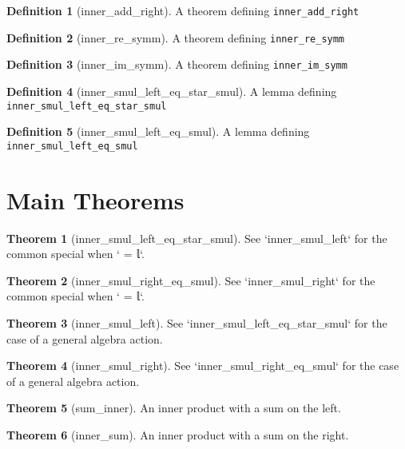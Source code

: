 \documentclass{article}
\theoremstyle{definition}
\newtheorem{definition}{Definition}
\newtheorem{theorem}{Theorem}
\begin{document}
\begin{definition}[inner_add_right]
A theorem defining \texttt{inner_add_right}
\end{definition}

\begin{definition}[inner_re_symm]
A theorem defining \texttt{inner_re_symm}
\end{definition}

\begin{definition}[inner_im_symm]
A theorem defining \texttt{inner_im_symm}
\end{definition}

\begin{definition}[inner_smul_left_eq_star_smul]
A lemma defining \texttt{inner_smul_left_eq_star_smul}
\end{definition}

\begin{definition}[inner_smul_left_eq_smul]
A lemma defining \texttt{inner_smul_left_eq_smul}
\end{definition}

\section{Main Theorems}
\begin{theorem}[inner_smul_left_eq_star_smul]
See `inner_smul_left` for the common special when ` = 𝕝`.
\end{theorem}

\begin{theorem}[inner_smul_right_eq_smul]
See `inner_smul_right` for the common special when ` = 𝕝`.
\end{theorem}

\begin{theorem}[inner_smul_left]
See `inner_smul_left_eq_star_smul` for the case of a general algebra action.
\end{theorem}

\begin{theorem}[inner_smul_right]
See `inner_smul_right_eq_smul` for the case of a general algebra action.
\end{theorem}

\begin{theorem}[sum_inner]
An inner product with a sum on the left.
\end{theorem}

\begin{theorem}[inner_sum]
An inner product with a sum on the right.
\end{theorem}
\end{document}
